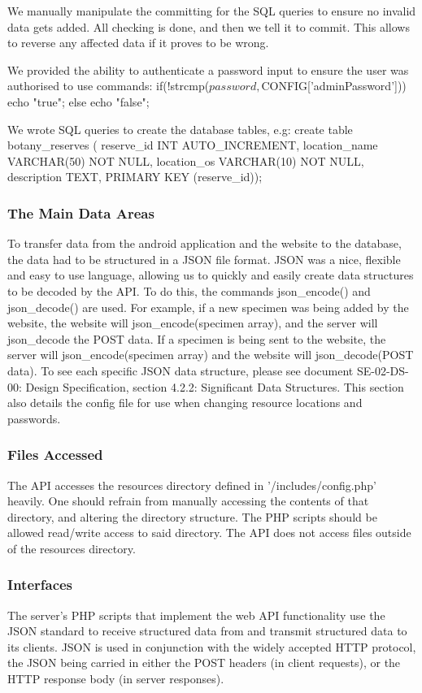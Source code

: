 We manually manipulate the committing for the SQL queries to ensure no invalid data gets added. All checking is done, and then we tell it to commit. This allows to reverse any affected data if it proves to be wrong.

We provided the ability to authenticate a password input to ensure the user was authorised to use commands:
if(!strcmp($password, $CONFIG['adminPassword']))	
{
	echo "true";
}
else
{
	echo "false";
}

We wrote SQL queries to create the database tables, e.g:
create table botany_reserves (
	reserve_id INT AUTO_INCREMENT,
    location_name VARCHAR(50) NOT NULL,
	location_os VARCHAR(10) NOT NULL,
	description TEXT,
	PRIMARY KEY (reserve_id)); 

    \subsubsection{The Main Data Areas}


To transfer data from the android application and the website to the database,  the data had to be structured in a JSON file format. JSON was a nice, flexible and easy to use language, allowing us 
to quickly and easily create data structures to be decoded by the API. To do this, the commands json_encode() and json_decode() are used. For example, if a new specimen was being added by the website, 
the website will json_encode(specimen array), and the server will json_decode the POST data. If a specimen is being sent to the website, the server will json_encode(specimen array) and the website 
will json_decode(POST data). To see each specific JSON data structure, please see document SE-02-DS-00: Design Specification, section 4.2.2: Significant Data Structures. This section also details 
the config file for use when changing resource locations and passwords. 

    \subsubsection{Files Accessed}

 	The API accesses the resources directory defined in '/includes/config.php'
	heavily. One should refrain from manually accessing the contents of that
	directory, and altering the directory structure. The PHP scripts should
	be allowed read/write access to said directory.
	The API does not access files outside of the resources directory.

    \subsubsection{Interfaces}
       The server's PHP scripts that implement the web API functionality use the 
    JSON standard to receive structured data from and transmit structured data 
    to its clients. JSON is used in conjunction with the widely accepted HTTP
    protocol, the JSON being carried in either the POST headers (in client 
    requests), or the HTTP response body (in server responses).
    
